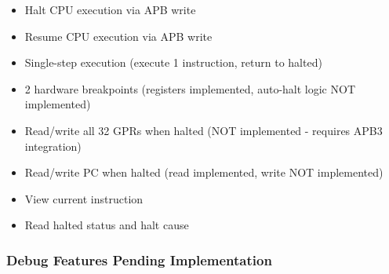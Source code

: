 \begin{record}

\begin{itemize}
\tightlist
\item
  \ok{} Halt CPU execution via APB write
\item
  \ok{} Resume CPU execution via APB write
\item
  \ok{} Single-step execution (execute 1 instruction, return to halted)
\item
  \wip{} 2 hardware breakpoints (registers implemented, auto-halt logic
  NOT implemented)
\item
  \bad{} Read/\allowbreak{}write all 32 GPRs when halted (NOT
  implemented - requires APB3 integration)
\item
  \wip{} Read/\allowbreak{}write PC when halted (read implemented, write
  NOT implemented)
\item
  \ok{} View current instruction
\item
  \ok{} Read halted status and halt cause
\end{itemize}

\end{record}

\subsubsection{Debug Features Pending Implementation}\label{cr:fix:cpu-verification-ready:debug-features-pending-implementation}

